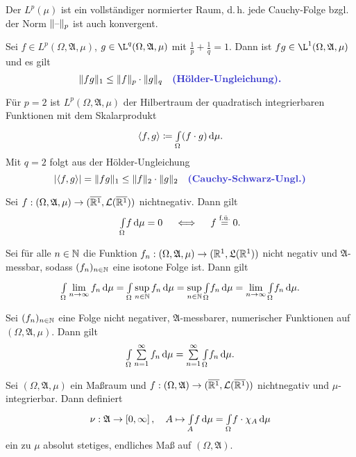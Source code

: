 \documentclass{cheat-sheet}
\newcommand{\Alg}{\mathfrak{A}} %
\newcommand{\LebAlg}{\mathfrak{L}} %
\newcommand{\Leb}{\mathcal{L}} %
\renewcommand{\ER}{\overline{\R^1}} %
\newcommand{\fue}{\overset{\text{f.ü.}}} %
\newcommand{\IntOmu}[1]{\Int{\Omega}{}{#1}{\mu}} %
\begin{document}
\begin{satz}
  Der $L^p(\mu)$ ist ein vollständiger normierter Raum, d.\,h. jede Cauchy-Folge bzgl. der Norm $\lVert\text{--}\rVert_p$ ist auch konvergent.
\end{satz}

\begin{satz}
  Sei $f \in L^p(\Omega, \Alg, \mu)$, $g \in \L^q(\Omega, \Alg, \mu)$ mit $\tfrac{1}{p} + \tfrac{1}{q} = 1$. Dann ist $fg \in \L^1(\Omega, \Alg, \mu)$ und es gilt
  \[ \norm{fg}_1 \leq \norm{f}_p \cdot \norm{g}_q \quad \text{\emph{(Hölder-Ungleichung).}} \]
\end{satz}

\begin{bem}
  Für $p = 2$ ist $L^p(\Omega, \Alg, \mu)$ der Hilbertraum der quadratisch integrierbaren Funktionen mit dem Skalarprodukt
  \[ \langle f , g \rangle \coloneqq \IntOmu{(f \cdot g)}. \]
  Mit $q = 2$ folgt aus der Hölder-Ungleichung
  \[ \abs{\langle f , g \rangle} = \norm{fg}_1 \leq \norm{f}_2 \cdot \norm{g}_2 \quad \text{\emph{(Cauchy-Schwarz-Ungl.)}} \]
\end{bem}

\begin{satz}
  Sei $f : (\Omega, \Alg, \mu) \to (\ER, \mathcal{L}(\ER))$ nichtnegativ. Dann gilt
  \[ \IntOmu{f} = 0 \quad \iff \quad f \fue{=} 0. \]
\end{satz}



\begin{satz}
  Sei für alle $n \in \mathbb{N}$ die Funktion $f_n : (\Omega, \Alg, \mu) \to (\R^1, \LebAlg(\R^1))$ nicht negativ und $\Alg$-messbar, sodass $(f_n)_{n \in \mathbb{N}}$ eine isotone Folge ist. Dann gilt
  \[ \IntOmu{\lim_{n \to \infty} f_n} = \IntOmu{\sup_{n \in \N} f_n} = \sup_{n \in \N} \IntOmu{f_n} = \lim_{n \to \infty} \IntOmu{f_n}. \]
\end{satz}

\begin{kor}
  Sei $(f_n)_{n \in \mathbb{N}}$ eine Folge nicht negativer, $\Alg$-messbarer, numerischer Funktionen auf $(\Omega, \Alg, \mu)$. Dann gilt
  \[ \IntOmu{\sum_{n=1}^{\infty} f_n} = \sum_{n=1}^\infty \IntOmu{f_n}. \]
\end{kor}

\begin{satz}
  Sei $(\Omega, \Alg, \mu)$ ein Maßraum und $f : (\Omega, \Alg) \to (\ER, \Leb(\ER))$ nichtnegativ und $\mu$-integrierbar. Dann definiert
  \[ \nu : \Alg \to \left[0, \infty \right], \quad A \mapsto \Int{A}{}{f}{\mu} = \IntOmu{f \cdot \chi_A} \]
  ein zu $\mu$ absolut stetiges, endliches Maß auf $(\Omega, \Alg)$.
\end{satz}
\end{document}

